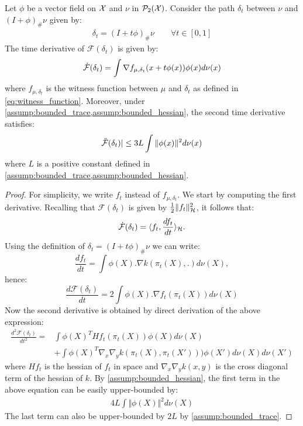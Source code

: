 \begin{lemma}\label{lem:derivative_mmd}
	Let $\phi$ be a vector field on ${{\mathcal X}}$ and $\nu$ in $\mathcal{P}_2({{\mathcal X}})$. Consider the path $\delta_t$ between $\nu$ and $(I+\phi)_{\#}\nu$ given by:
	\begin{align*}
		\delta_t=  (I+t\phi)_{\#}\nu \qquad \forall t\in [0,1]
	\end{align*}
The time derivative of $\mathcal{F}(\delta_t)$ is given by:
	\begin{align*}
		\dot{{{\mathcal F}}}(\delta_t)&=\int \nabla f_{\mu,\delta_t}(x+t\phi(x)) \phi(x)d\nu(x)\\
	\end{align*}
where $f_{\mu,\delta_t}$ is the witness function between $\mu$ and $\delta_t$ as defined in \cref{eq:witness_function}.	
	Moreover, under \cref{assump:bounded_trace,assump:bounded_hessian}, the second time derivative satisfies:
	\begin{align*}
		\ddot{{{\mathcal F}}}(\delta_t) \vert \leq 3L \int \Vert \phi(x) \Vert^2 d\nu(x)
	\end{align*}
	where $L$ is a positive constant defined in \cref{assump:bounded_trace,assump:bounded_hessian}.
	
\end{lemma}
\begin{proof}
For simplicity, we write $f_t$ instead of $f_{\mu,\delta_t}$.
We start by computing the first derivative. Recalling that $\mathcal{F}(\delta_t)$ is given by $\frac{1}{2}\Vert f_t\Vert^2_{{{\mathcal H}}} $, it follows that:
\[
\dot{{{\mathcal F}}}(\delta_t)=\langle f_{t},\frac{df_{t}}{dt}\rangle_{{{\mathcal H}}}.
\]
Using the definition
of $\delta_{t}=(I+t\phi)_{\#}\nu$ we can write:
\[
\frac{df_{t}}{dt}=\int \phi(X).\nabla k(\pi_{t}(X),.)d\nu(X),
\]
hence:
\[
\frac{d\mathcal{F}(\delta_{t})}{dt}=2\int\phi(X).\nabla f_{t}(\pi_{t}(X))d\nu(X)
\]
Now the second derivative is obtained by direct derivation of the above expression:
	\begin{align*}
		\frac{d^2 \mathcal{F}(\delta_t)}{dt^2} =& \int \phi(X)^THf_t(\pi_t(X))\phi(X)d\nu(X)\\ 
		&+\int \phi(X)^T\nabla_x\nabla_y k(\pi_t(X),\pi_t(X')) ) \phi(X')d\nu(X)d\nu(X') 
	\end{align*}
where $Hf_t$ is the hessian of $f_t$ in space and  $\nabla_x\nabla_y k(x,y)$ is the cross diagonal term of the hessian of $k$. By \ref{assump:bounded_hessian}, the first term in the above equation can be easily upper-bounded by:
\begin{align*}
	4L \int \Vert \phi(X)\Vert^2d\nu(X)  
\end{align*}
The last term can also be upper-bounded by $2L$ by \ref{assump:bounded_trace}.
\end{proof}


